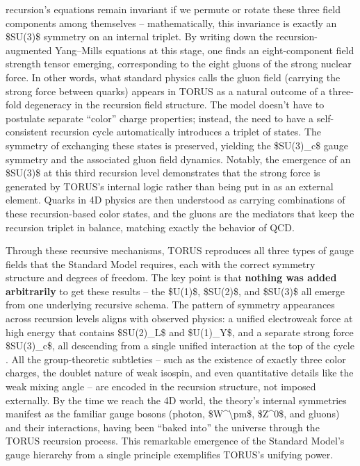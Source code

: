 \begin{itemize}
  recursion's equations remain invariant if we permute or rotate these
  three field components among themselves -- mathematically, this
  invariance is exactly an \$SU(3)\$ symmetry on an internal triplet​.
  By writing down the recursion-augmented Yang--Mills equations at this
  stage, one finds an eight-component field strength tensor emerging,
  corresponding to the eight gluons of the strong nuclear force​. In
  other words, what standard physics calls the gluon field (carrying the
  strong force between quarks) appears in TORUS as a natural outcome of
  a three-fold degeneracy in the recursion field structure​. The model
  doesn't have to postulate separate ``color'' charge properties;
  instead, the need to have a self-consistent recursion cycle
  automatically introduces a triplet of states. The symmetry of
  exchanging these states is preserved, yielding the \$SU(3)\_c\$ gauge
  symmetry and the associated gluon field dynamics​. Notably, the
  emergence of an \$SU(3)\$ at this third recursion level demonstrates
  that the strong force is generated by TORUS's internal logic rather
  than being put in as an external element​. Quarks in 4D physics are
  then understood as carrying combinations of these recursion-based
  color states, and the gluons are the mediators that keep the recursion
  triplet in balance, matching exactly the behavior of QCD.
\end{itemize}

Through these recursive mechanisms, TORUS reproduces all three types of
gauge fields that the Standard Model requires, each with the correct
symmetry structure and degrees of freedom. The key point is that
\textbf{nothing was added arbitrarily} to get these results -- the
\$U(1)\$, \$SU(2)\$, and \$SU(3)\$ all emerge from one underlying
recursive schema. The pattern of symmetry appearances across recursion
levels aligns with observed physics: a unified electroweak force at high
energy that contains \$SU(2)\_L\$ and \$U(1)\_Y\$, and a separate strong
force \$SU(3)\_c\$, all descending from a single unified interaction at
the top of the cycle​. All the group-theoretic subtleties -- such as the
existence of exactly three color charges, the doublet nature of weak
isospin, and even quantitative details like the weak mixing angle -- are
encoded in the recursion structure, not imposed externally​. By the time
we reach the 4D world, the theory's internal symmetries manifest as the
familiar gauge bosons (photon, \$W\^{}\textbackslash{}pm\$, \$Z\^{}0\$,
and gluons) and their interactions, having been ``baked into'' the
universe through the TORUS recursion process. This remarkable emergence
of the Standard Model's gauge hierarchy from a single principle
exemplifies TORUS's unifying power.

